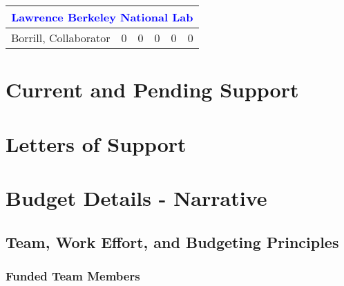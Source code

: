 \documentclass[12pt]{article}
\begin{document}
\begin{table}[h]
\begin{center}
\begin{tabular}{|c|c|c|c|c|c|}
\multicolumn{6}{|c|}{\textcolor{blue}{Lawrence Berkeley National Lab} }  \\ \hline
Borrill, Collaborator   &  0  &  0  & 0 & 0 & 0  \\ \hline
\end{tabular}
\end{center}
\vspace{-0.1in}
\end{table}

\newpage

\section{Current and Pending Support}
\label{sec:current_and_pending}

\newpage
\addtocounter{page}{13}
\section{Letters of Support}
\label{sec:lettersofsupport}

\newpage
\addtocounter{page}{3}
\section{Budget Details - Narrative}
\label{sec:budget}

\subsection{Team, Work Effort, and Budgeting Principles}
\label{sec:budget_principles}


\subsubsection{Funded Team Members}

\end{document}
